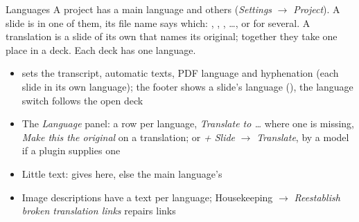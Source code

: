 
\begin{standardframe}{Languages}
	\small
	A project has a main language and others (\emph{Settings} $\rightarrow$ \emph{Project}). A slide is in one of them, its file name says which: , , , \ldots, or  for several. A translation is a slide of its own that names its original; together they take one place in a deck. Each deck has one language.
	\par\medskip
	\begin{itemize}
		\item {}\SMCode{[fr]} sets the transcript, automatic texts, PDF language and hyphenation (each slide in its own language); the footer shows a slide's language (), the language switch follows the open deck
		\item The \emph{Language} panel: a row per language, \emph{Translate to \ldots} where one is missing, \emph{Make this the original} on a translation; or \emph{+ Slide} $\rightarrow$ \emph{Translate}, by a model if a plugin supplies one
		\item Little text:  gives \emph{} here, else the main language's
		\item Image descriptions have a text per language; Housekeeping $\rightarrow$ \emph{Reestablish broken translation links} repairs links
	\end{itemize}
\end{standardframe}
